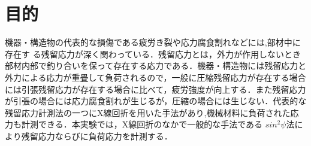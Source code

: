 \section{目的}
機器・構造物の代表的な損傷である疲労き裂や応力腐食割れなどには,部材中に存在す
る残留応力が深く関わっている．残留応力とは，外力が作用しないとき部材内部で釣り合いを保って存在する応力である．機器・構造物には残留応力と外力による応力が重畳して負荷されるので，一般に圧縮残留応力が存在する場合には引張残留応力が存在する場合に比べて，疲労強度が向上する．また残留応力が引張の場合には応力腐食割れが生じるが，圧縮の場合には生じない．代表的な残留応力計測法の一つにX線回折を用いた手法があり,機械材料に負荷された応力も計測できる．本実験では，X線回折のなかで一般的な手法である $sin^2\psi$法により残留応力ならびに負荷応力を計測する．